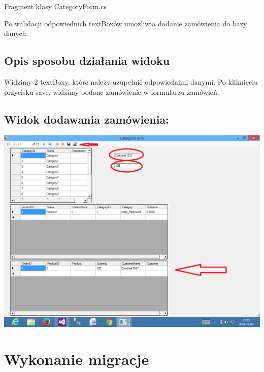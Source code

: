 \documentclass[a4paper, 11pt]{article}
\begin{document}
    Fragment klasy CategoryForm.cs
    
    Po walidacji odpowiednich textBoxów umożliwia dodanie zamówienia do bazy danych.
    
    
    
    \subsection{Opis sposobu działania widoku}
    
    Widzimy 2 textBoxy, które należy uzupełnić odpowiednimi danymi.
    Po kliknięciu przycisku save, widzimy podane zamówienie w formularzu zamówień.
    
    \newpage

    \subsection{Widok dodawania zamówienia:}
    
    \begin{center}
        \includegraphics{images/AddOrder.png}
    \end{center}
    
    \newpage
    
    
    \section{Wykonanie migracje}
    
    
    
    
\end{document}
